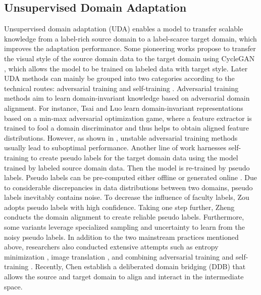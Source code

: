 \documentclass[10pt,twocolumn,letterpaper]{article}
\begin{document}
\subsection{Unsupervised Domain Adaptation}
Unsupervised domain adaptation (UDA) enables a model to transfer scalable knowledge from a label-rich source domain to a label-scarce target domain, which improves the adaptation performance. Some pioneering works \cite{hoffman2018cycada, wu2018dcan} propose to transfer the visual style of the source domain data to the target domain using CycleGAN \cite{zhu2017unpaired}, which allows the model to be trained on labeled data with target style. Later UDA methods can mainly be grouped into two categories according to the technical routes: adversarial training \cite{tsai2018learning, yang2020fda, FeiPan2020UnsupervisedIA, luo2019taking, luo2021category, vu2019advent} and self-training \cite{YangZou2018UnsupervisedDA, zou2019confidence, KeMei2020InstanceAS, kang2020adversarial, PanZhang2021PrototypicalPL, WilhelmTranheden2020DACSDA, QianyuZhou2022UncertaintyAwareCR}. Adversarial training methods aim to learn domain-invariant knowledge based on adversarial domain alignment. For instance, Tsai \etal \cite{tsai2018learning} and Luo \etal \cite{luo2019taking} learn domain-invariant representations based on a min-max adversarial optimization game, where a feature extractor is trained to fool a domain discriminator and thus helps to obtain aligned feature distributions. 
However, as shown in \cite{zheng2022adaptive}, unstable adversarial training methods usually lead to suboptimal performance.
Another line of work harnesses self-training to create pseudo labels for the target domain data using the model trained by labeled source domain data. Then the model is re-trained by pseudo labels. Pseudo labels can be pre-computed either offline \cite{YangZou2018UnsupervisedDA, yang2020fda} or generated online \cite{WilhelmTranheden2020DACSDA, hoyer2022daformer}. Due to considerable discrepancies in data distributions between two domains, pseudo labels inevitably contains noise. To decrease the influence of faculty labels, Zou \etal \cite{YangZou2018UnsupervisedDA, zou2019confidence} adopts pseudo labels with high confidence. Taking one step further, Zheng \etal \cite{zheng2019unsupervised} conducts the domain alignment to create reliable pseudo labels. Furthermore, some variants leverage specialized sampling \cite{KeMei2020InstanceAS} and uncertainty \cite{zheng2021rectifying} to learn from the noisy  pseudo labels. 
In addition to the two mainstream practices mentioned above, researchers also conducted extensive attempts such as entropy minimization \cite{vu2019advent, chen2019domain}, image translation \cite{ShaohuaGuo2021LabelFreeRC, JinyuYang2020LabelDrivenRF}, and combining adversarial training and self-training \cite{li2019bidirectional, HaoranWang2020ClassesMA,zheng2022adaptive}. Recently, Chen \etal \cite{chen2022deliberated} establish a deliberated domain bridging (DDB) that allows the source and target domain to align and interact in the intermediate space.
\end{document}
